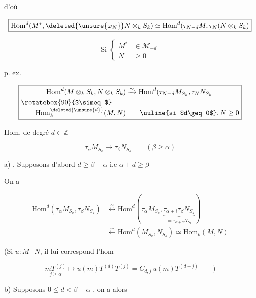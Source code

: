 
d'où

\[
\boxed{\mathrm{Hom}^{d}(M^{*},\deleted{\unsure{\varphi_N}}N\otimes_k S_k)\simeq\mathrm{Hom}^{d}(\tau_{N-d}M,\tau_N(N\otimes_k S_k)}
\]

\[
\text{Si }\left\{\begin{aligned}M^{*}&\in\mathcal{M}_{-d}\\ N&\geq0\end{aligned}\right.
\]

p. ex.

\[
\boxed{\begin{aligned}
\mathrm{Hom}^{d}(M\otimes_k S_k,N\otimes_k S_k)&\xrightarrow{\sim}\mathrm{Hom}^{d}(\tau_{N-d}M_{S_k},\tau_N N_{S_k}\\
\rotatebox{90}{$\simeq$}\qquad&\\[-3pt]
\mathrm{Hom}^{\deleted{\unsure{d}}}_k(M,N)&\qquad \text{\uuline{si $d\geq0$}},N\geq0
\end{aligned}}
\]

Hom.  de degré $d\in\mathbb{Z}$

\[
\tau_\alpha M_{S_k}\longrightarrow\tau_\beta N_{S_k}\qquad(\beta\geq\alpha)
\]

a) . Supposons d'abord $\boxed{d\geq\beta-\alpha}$ i.e $\alpha+d\geq\beta$

On a -

\[
\begin{aligned}
\mathrm{Hom}^{d}(\tau_\alpha M_{S_k},\tau_\beta N_{S_k})&\overset{\sim}{\longleftrightarrow}\mathrm{Hom}^{d}(\tau_\alpha M_{S_k},\underbrace{\tau_{\alpha+i}\tau_\beta N_{S_k}}_{=\tau_{\alpha+d}N_{S_k}})\\
&\xleftarrow{\sim}\mathrm{Hom}^{d}(M_{S_k},N_{S_k})\simeq\mathrm{Hom}_k(M,N)
\end{aligned}
\]

(Si $u:M\mathord{-} N$, il lui correspond l'hom

\[
\underset{j\geq\alpha}{mT^{(j)}}\longmapsto u(m)T^{(d)}T^{(j)}=C_{d,j}\,u(m)T^{(d+j)}\qquad\bigg)
\]

b) Supposons $0\leq d<\beta-\alpha$ , on a alors


